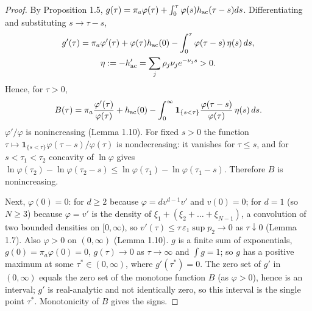 \documentclass[11pt,a4paper]{article}
\theoremstyle{definition}
\theoremstyle{remark}
\begin{document}
\begin{proof}
By Proposition 1.5, $g(\tau)=\pi_a\varphi(\tau)+\int_0^\tau\varphi(s)h_{\rm ac}(\tau-s)ds$. Differentiating and substituting $s\to\tau-s$,
\begin{gather*}
g'(\tau)=\pi_a\varphi'(\tau)+\varphi(\tau)h_{\rm ac}(0)-\int_0^\tau\varphi(\tau-s)\,\eta(s)\,ds, \\
\eta:=-h_{\rm ac}'=\sum_j\rho_j\nu_je^{-\nu_js}>0 .
\end{gather*}
Hence, for $\tau>0$,
\begin{equation*}
B(\tau)=\pi_a\frac{\varphi'(\tau)}{\varphi(\tau)}+h_{\rm ac}(0)-\int_0^\infty\mathbf 1_{\{s<\tau\}}\frac{\varphi(\tau-s)}{\varphi(\tau)}\,\eta(s)\,ds .
\end{equation*}
$\varphi'/\varphi$ is nonincreasing (Lemma 1.10). For fixed $s>0$ the function $\tau\mapsto\mathbf 1_{\{s<\tau\}}\varphi(\tau-s)/\varphi(\tau)$ is nondecreasing: it vanishes for $\tau\le s$, and for $s<\tau_1<\tau_2$ concavity of $\ln\varphi$ gives $\ln\varphi(\tau_2)-\ln\varphi(\tau_2-s)\le\ln\varphi(\tau_1)-\ln\varphi(\tau_1-s)$. Therefore $B$ is nonincreasing.

Next, $\varphi(0)=0$: for $d\ge2$ because $\varphi=dv^{d-1}v'$ and $v(0)=0$; for $d=1$ (so $N\ge3$) because $\varphi=v'$ is the density of $\xi_1+(\xi_2+\dots+\xi_{N-1})$, a convolution of two bounded densities on $[0,\infty)$, so $v'(\tau)\le\tau\,\varepsilon_1\sup p_2\to0$ as $\tau\downarrow0$ (Lemma 1.7). Also $\varphi>0$ on $(0,\infty)$ (Lemma 1.10). $g$ is a finite sum of exponentials, $g(0)=\pi_a\varphi(0)=0$, $g(\tau)\to0$ as $\tau\to\infty$ and $\int g=1$; so $g$ has a positive maximum at some $\tau^*\in(0,\infty)$, where $g'(\tau^*)=0$. The zero set of $g'$ in $(0,\infty)$ equals the zero set of the monotone function $B$ (as $\varphi>0$), hence is an interval; $g'$ is real-analytic and not identically zero, so this interval is the single point $\tau^*$. Monotonicity of $B$ gives the signs.
\end{proof}
\end{document}
